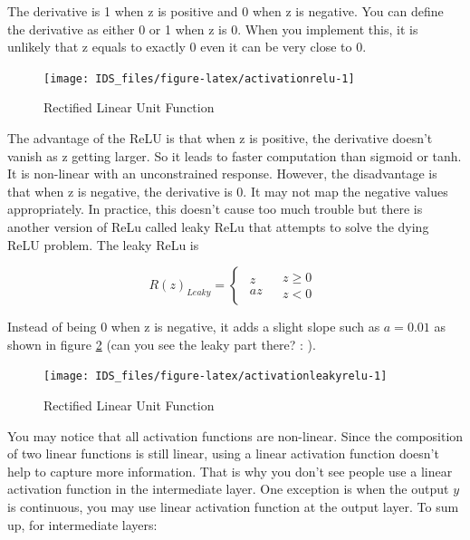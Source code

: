 \documentclass[12pt,]{krantz}
\begin{document}
The derivative is 1 when z is positive and 0 when z is negative. You can define the derivative as either 0 or 1 when z is 0. When you implement this, it is unlikely that z equals to exactly 0 even it can be very close to 0.

\begin{figure}

{\centering \texttt{[image: IDS\_files/figure-latex/activationrelu-1]} 

}

\caption{Rectified Linear Unit Function}\label{fig:activationrelu}
\end{figure}

The advantage of the ReLU is that when z is positive, the derivative doesn't vanish as z getting larger. So it leads to faster computation than sigmoid or tanh. It is non-linear with an unconstrained response. However, the disadvantage is that when z is negative, the derivative is 0. It may not map the negative values appropriately. In practice, this doesn't cause too much trouble but there is another version of ReLu called leaky ReLu that attempts to solve the dying ReLU problem. The leaky ReLu is

\[R(z)_{Leaky}=\begin{cases}
\begin{array}{c}
z\\
az
\end{array} & \begin{array}{c}
z\geq0\\
z<0
\end{array}\end{cases}\]

Instead of being 0 when z is negative, it adds a slight slope such as \(a=0.01\) as shown in figure \ref{fig:activationleakyrelu} (can you see the leaky part there? : ).

\begin{figure}

{\centering \texttt{[image: IDS\_files/figure-latex/activationleakyrelu-1]} 

}

\caption{Rectified Linear Unit Function}\label{fig:activationleakyrelu}
\end{figure}

You may notice that all activation functions are non-linear. Since the composition of two linear functions is still linear, using a linear activation function doesn't help to capture more information. That is why you don't see people use a linear activation function in the intermediate layer. One exception is when the output \(y\) is continuous, you may use linear activation function at the output layer. To sum up, for intermediate layers:
\end{document}
